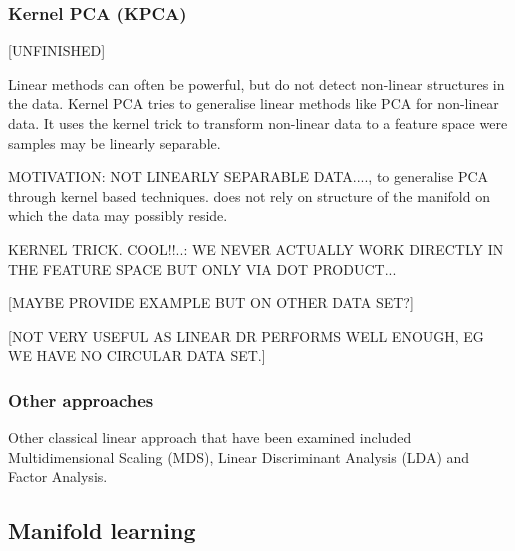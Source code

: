 \documentclass[journal, a4paper]{IEEEtran}
\begin{document}
\hfill
\subsubsection{Kernel PCA (KPCA)}
[UNFINISHED]

Linear methods can often be powerful, but do not detect non-linear structures in the data.
Kernel PCA tries to generalise linear methods like PCA for non-linear data.
It uses the kernel trick to transform non-linear data to a feature space were samples may be linearly separable.

MOTIVATION: NOT LINEARLY SEPARABLE DATA...., to generalise PCA through kernel based techniques. does not rely on structure of the manifold on which the data may possibly reside. 

KERNEL TRICK. COOL!!..: WE NEVER ACTUALLY WORK DIRECTLY IN THE FEATURE SPACE BUT ONLY VIA DOT PRODUCT...


[MAYBE PROVIDE EXAMPLE BUT ON OTHER DATA SET?]

[NOT VERY USEFUL AS LINEAR DR PERFORMS WELL ENOUGH, EG WE HAVE NO CIRCULAR DATA SET.] 


\hfill
\subsubsection{Other approaches}

Other classical linear approach that have been examined included Multidimensional Scaling (MDS), Linear Discriminant Analysis (LDA) and Factor Analysis. 



\subsection{Manifold learning}
\end{document}
